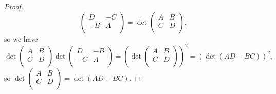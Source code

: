 \begin{proof}
\[\begin{pmatrix}
            D & -C  \\
            -B & A  \\
        \end{pmatrix} = \det \begin{pmatrix}
            A & B  \\
            C & D  \\
        \end{pmatrix},
    \] so we have 
    \[
        \det \begin{pmatrix}
            A & B  \\
            C & D  \\
        \end{pmatrix} \det \begin{pmatrix}
            D & -B  \\
            -C & A  \\
        \end{pmatrix} = \left( \det \begin{pmatrix}
            A & B  \\
            C & D  \\
        \end{pmatrix} \right)^2 = \left( \det (AD-BC) \right)^2,
    \] so \(\det \begin{pmatrix}
        A & B  \\
        C & D  \\
    \end{pmatrix} = \det (AD - BC)\). 
\end{proof}